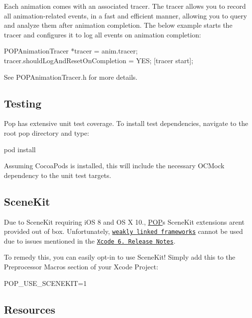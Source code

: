 Each animation comes with an associated tracer. The tracer allows you to record all animation-\/related events, in a fast and efficient manner, allowing you to query and analyze them after animation completion. The below example starts the tracer and configures it to log all events on animation completion\+:


\begin{DoxyCode}
POPAnimationTracer *tracer = anim.tracer;
tracer.shouldLogAndResetOnCompletion = YES;
[tracer start];
\end{DoxyCode}


See {\ttfamily P\+O\+P\+Animation\+Tracer.\+h} for more details.

\subsection*{Testing}

Pop has extensive unit test coverage. To install test dependencies, navigate to the root pop directory and type\+:


\begin{DoxyCode}
pod install
\end{DoxyCode}


Assuming Cocoa\+Pods is installed, this will include the necessary O\+C\+Mock dependency to the unit test targets.

\subsection*{Scene\+Kit}

Due to Scene\+Kit requiring i\+OS 8 and OS X 10., \mbox{\hyperlink{namespace_p_o_p}{P\+OP}}\textquotesingle{}s Scene\+Kit extensions aren\textquotesingle{}t provided out of box. Unfortunately, \href{https://developer.apple.com/library/mac/documentation/MacOSX/Conceptual/BPFrameworks/Concepts/WeakLinking.html}{\tt weakly linked frameworks} cannot be used due to issues mentioned in the \href{https://developer.apple.com/library/ios/releasenotes/DeveloperTools/RN-Xcode/Chapters/xc6_release_notes.html}{\tt Xcode 6. Release Notes}.

To remedy this, you can easily opt-\/in to use Scene\+Kit! Simply add this to the Preprocessor Macros section of your Xcode Project\+:


\begin{DoxyCode}
POP\_USE\_SCENEKIT=1
\end{DoxyCode}


\subsection*{Resources}

